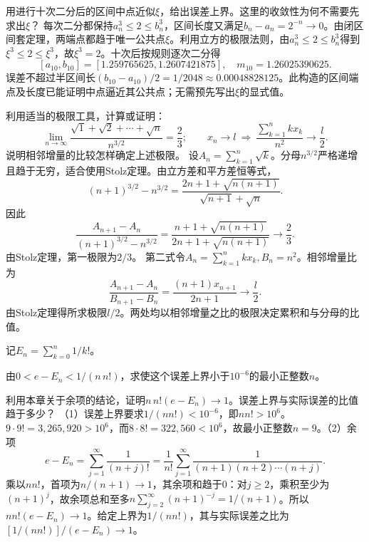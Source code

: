 \quad {}用进行十次二分后的区间中点近似\(\xi\)，给出误差上界。这里的收敛性为何不需要先求出\(\xi\)？
\solutionanswer
每次二分都保持\(a_n^3\le2\le b_n^3\)，区间长度又满足\(b_n-a_n=2^{-n}\to0\)。由闭区间套定理，两端点都趋于唯一公共点\(\xi\)。利用立方的极限法则，由\(a_n^3\le2\le b_n^3\)得到\(\xi^3\le2\le\xi^3\)，故\(\xi^3=2\)。十次后按规则逐次二分得
\[[a_{10},b_{10}]=[1.259765625,1.2607421875],\quad m_{10}=1.26025390625.\]
误差不超过半区间长\((b_{10}-a_{10})/2=1/2048\approx0.00048828125\)。此构造的区间端点及长度已能证明中点逼近其公共点；无需预先写出\(\xi\)的显式值。


利用适当的极限工具，计算或证明：
\begin{equation*}
 \lim_{n\to\infty}\frac{\sqrt1+\sqrt2+\cdots+\sqrt n}{n^{3/2}}=\frac23;
 \qquad
 x_n\to l\ \Longrightarrow\
 \frac{\sum_{k=1}^n kx_k}{n^2}\to\frac l2.
\end{equation*}
说明相邻增量的比较怎样确定上述极限。
\solutionanswer
设\(A_n=\sum_{k=1}^n\sqrt k\)。分母\(n^{3/2}\)严格递增且趋于无穷，适合使用Stolz定理。由立方差和平方差恒等式，
\[
(n+1)^{3/2}-n^{3/2}
=\frac{2n+1+\sqrt{n(n+1)}}{\sqrt{n+1}+\sqrt n}.
\]
因此
\[
\frac{A_{n+1}-A_n}{(n+1)^{3/2}-n^{3/2}}
=\frac{n+1+\sqrt{n(n+1)}}{2n+1+\sqrt{n(n+1)}}\to\frac23.
\]
由Stolz定理，第一极限为\(2/3\)。
第二式令\(A_n=\sum_{k=1}^n kx_k,B_n=n^2\)。相邻增量比为
\[\frac{A_{n+1}-A_n}{B_{n+1}-B_n}=\frac{(n+1)x_{n+1}}{2n+1}\to\frac l2.\]
由Stolz定理得所求极限\(l/2\)。两处均以相邻增量之比的极限决定累积和与分母的比值。


记\(E_n=\sum_{k=0}^n1/k!\)。

\quad {}由\(0<e-E_n<1/(n\,n!)\)，求使这个误差上界小于\(10^{-6}\)的最小正整数\(n\)。

\quad {}利用本章关于余项的结论，证明\(n\,n!(e-E_n)\to1\)。误差上界与实际误差的比值趋于多少？
\solutionanswer
（1）误差上界要求\(1/(n n!)<10^{-6}\)，即\(n n!>10^6\)。\(9\cdot9!=3,265,920>10^6\)，而\(8\cdot8!=322,560<10^6\)，故最小正整数\(n=9\)。（2）余项
\[e-E_n=\sum_{j=1}^{\infty}\frac1{(n+j)!}=\frac1{n!}\sum_{j=1}^{\infty}\frac1{(n+1)(n+2)\cdots(n+j)}.\]
乘以\(n n!\)，首项为\(n/(n+1)\to1\)，其余项和趋于0：对\(j\ge2\)，乘积至少为\((n+1)^j\)，故余项总和至多\(n\sum_{j=2}^\infty(n+1)^{-j}=1/(n+1)\)。所以\(n n!(e-E_n)\to1\)。给定上界为\(1/(n n!)\)，其与实际误差之比为\([1/(n n!)]/(e-E_n)\to1\)。


